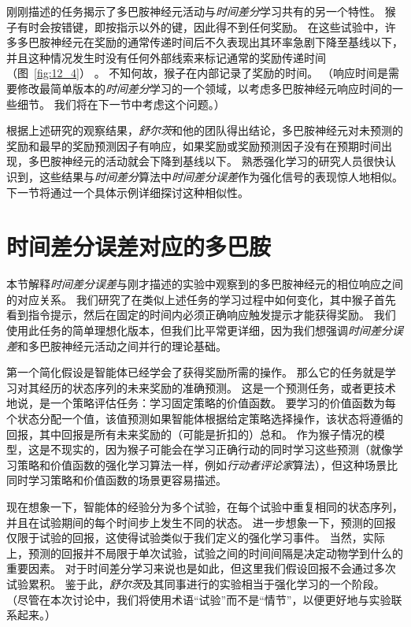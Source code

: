刚刚描述的任务揭示了多巴胺神经元活动与\textit{时间差分}学习共有的另一个特性。
猴子有时会按错键，即按指示以外的键，因此得不到任何奖励。
在这些试验中，许多多巴胺神经元在奖励的通常传递时间后不久表现出其环率急剧下降至基线以下，并且这种情况发生时没有任何外部线索来标记通常的奖励传递时间（图~\ref{fig:12_4}） 。
不知何故，猴子在内部记录了奖励的时间。
（响应时间是需要修改最简单版本的\textit{时间差分}学习的一个领域，以考虑多巴胺神经元响应时间的一些细节。
我们将在下一节中考虑这个问题。）


根据上述研究的观察结果，\textit{舒尔茨}和他的团队得出结论，多巴胺神经元对未预测的奖励和最早的奖励预测因子有响应，如果奖励或奖励预测因子没有在预期时间出现，多巴胺神经元的活动就会下降到基线以下。
熟悉强化学习的研究人员很快认识到，这些结果与\textit{时间差分}算法中\textit{时间差分误差}作为强化信号的表现惊人地相似。
下一节将通过一个具体示例详细探讨这种相似性。


\section{时间差分误差对应的多巴胺} \label{sec:td_dopamine}

本节解释\textit{时间差分误差}与刚才描述的实验中观察到的多巴胺神经元的相位响应之间的对应关系。
我们研究了在类似上述任务的学习过程中如何变化，其中猴子首先看到指令提示，然后在固定的时间内必须正确响应触发提示才能获得奖励。
我们使用此任务的简单理想化版本，但我们比平常更详细，因为我们想强调\textit{时间差分误差}和多巴胺神经元活动之间并行的理论基础。


第一个简化假设是智能体已经学会了获得奖励所需的操作。
那么它的任务就是学习对其经历的状态序列的未来奖励的准确预测。
这是一个预测任务，或者更技术地说，是一个策略评估任务：学习固定策略的价值函数。
要学习的价值函数为每个状态分配一个值，该值预测如果智能体根据给定策略选择操作，该状态将遵循的回报，其中回报是所有未来奖励的（可能是折扣的）总和。
作为猴子情况的模型，这是不现实的，因为猴子可能会在学习正确行动的同时学习这些预测（就像学习策略和价值函数的强化学习算法一样，例如\textit{行动者}\textit{评论家}算法），但这种场景比同时学习策略和价值函数的场景更容易描述。


现在想象一下，智能体的经验分为多个试验，在每个试验中重复相同的状态序列，并且在试验期间的每个时间步上发生不同的状态。
进一步想象一下，预测的回报仅限于试验的回报，这使得试验类似于我们定义的强化学习事件。
当然，实际上，预测的回报并不局限于单次试验，试验之间的时间间隔是决定动物学到什么的重要因素。
对于时间差分学习来说也是如此，但这里我们假设回报不会通过多次试验累积。
鉴于此，\textit{舒尔茨}及其同事进行的实验相当于强化学习的一个阶段。
（尽管在本次讨论中，我们将使用术语“试验”而不是“情节”，以便更好地与实验联系起来。）


